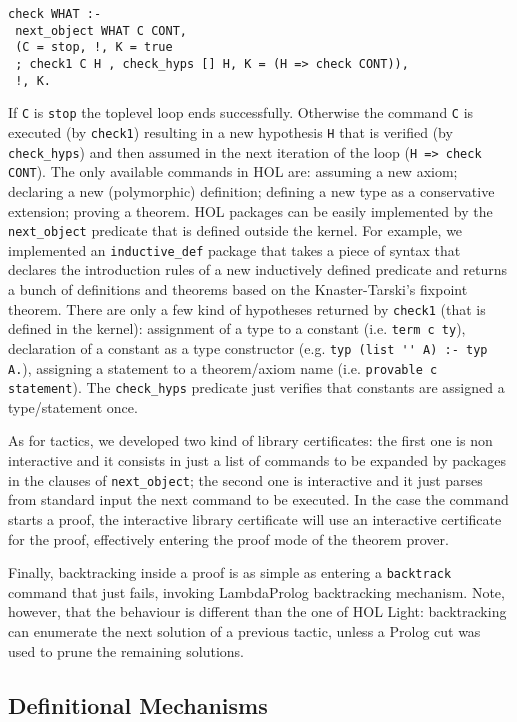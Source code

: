 \documentclass[preprint]{sigplanconf}
\begin{document}
{\small
\begin{verbatim}
check WHAT :-
 next_object WHAT C CONT,
 (C = stop, !, K = true
 ; check1 C H , check_hyps [] H, K = (H => check CONT)),
 !, K.
\end{verbatim}
}

If \verb+C+ is \verb+stop+ the toplevel loop ends successfully. Otherwise the command \verb+C+ is executed (by \verb+check1+) resulting in a new hypothesis \verb+H+ that is verified (by \verb+check_hyps+) and then assumed in the next iteration of the loop (\verb+H => check CONT+). The only available commands in HOL are: assuming a new axiom; declaring a new (polymorphic) definition; defining a new type as a conservative extension; proving a theorem. HOL packages can be easily implemented by the \verb+next_object+ predicate that is defined outside the kernel. For example, we implemented an \verb+inductive_def+ package that takes a piece of syntax that declares the introduction rules of a new inductively defined predicate and returns a bunch of definitions and theorems based on the Knaster-Tarski's fixpoint theorem. There are only a few kind of hypotheses returned by \verb+check1+ (that is defined in the kernel): assignment of a type to a constant (i.e. \verb+term c ty+), declaration of a constant as a type constructor (e.g. \verb+typ (list '' A) :- typ A.+), assigning a statement to a theorem/axiom name (i.e. \verb+provable c statement+). The \verb+check_hyps+ predicate just verifies that constants are assigned a type/statement once.

As for tactics, we developed two kind of library certificates: the first one is non interactive and it consists in just a list of commands to be expanded by packages in the clauses of \verb+next_object+; the second one is interactive and it just parses from standard input the next command to be executed. In the case the command starts a proof, the interactive library certificate will use an interactive certificate for the proof, effectively entering the proof mode of the theorem prover.

Finally, backtracking inside a proof is as simple as entering a \verb+backtrack+ command that just fails, invoking LambdaProlog backtracking mechanism. Note, however, that the behaviour is different than the one of HOL Light: backtracking can enumerate the next solution of a previous tactic, unless a Prolog cut was used to prune the remaining solutions.

\subsection{Definitional Mechanisms}
\end{document}
